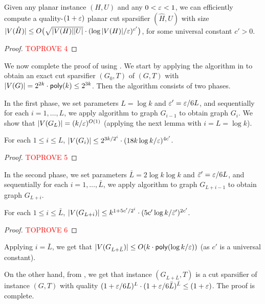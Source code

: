 \begin{lemma}
\label{lem: recursive}
Given any planar instance $(H,U)$ and any $0<{\varepsilon}<1$, we can efficiently compute a quality-$(1+{\varepsilon})$ planar cut sparsifier $(\hat H, U)$ with size $|V(\hat H)|\le O\big(\sqrt{|V(H)| |U|}\cdot (\log |V(H)|/{\varepsilon})^{c'}\big)$, for some universal constant $c'>0$.
\end{lemma}

\begin{proof}\textcolor{red}{TOPROVE 4}\end{proof}


We now complete the proof of  using . We start by applying the algorithm in \cite{krauthgamer2017refined} to obtain an exact cut sparsifier $(G_0,T)$ of $(G,T)$ with $|V(G)|=2^{2k}\cdot \mathsf{poly}(k)\le 2^{3k}$.
Then the algorithm consists of two phases.

In the first phase, we set parameters $L=\log k$ and ${\varepsilon}'={\varepsilon}/6L$, and sequentially for each $i=1,\ldots,L$, we apply algorithm  to graph $G_{i-1}$ to obtain graph $G_i$.
We show that $|V(G_L)|=(k/{\varepsilon})^{O(1)}$ (applying the next lemma with $i=L=\log k$).

\begin{claim}
For each $1\le i\le L$, $|V(G_i)|\le 2^{3k/2^i}\cdot (18k\log k/{\varepsilon})^{4c'}$.
\end{claim}
\begin{proof}\textcolor{red}{TOPROVE 5}\end{proof}

In the second phase, we set parameters $\bar L=2\log k\log k$ and $\bar{{\varepsilon}}'={\varepsilon}/6L$, and sequentially for each $i=1,\ldots,\bar L$, we apply algorithm  to graph $G_{L+i-1}$ to obtain graph $G_{L+i}$.

\begin{claim}
	For each $1\le i\le \bar L$, $|V(G_{L+i})|\le k^{1+5c'/2^i}\cdot (5c'\log k/\bar{{\varepsilon}}')^{2c'}$.
\end{claim}
\begin{proof}\textcolor{red}{TOPROVE 6}\end{proof}
Applying $i=\bar L$, we get that $|V(G_{L+\bar L})|\le O(k\cdot \mathsf{poly}(\log k/{\varepsilon}))$ (as $c'$ is a universal constant).

On the other hand, from , we get that instance $(G_{L+\bar L},T)$ is a cut sparsifier of  instance $(G,T)$ with quality
$(1+{\varepsilon}/6L)^L\cdot (1+{\varepsilon}/6\bar L)^{\bar L}\le (1+{\varepsilon})$. The proof is complete.









